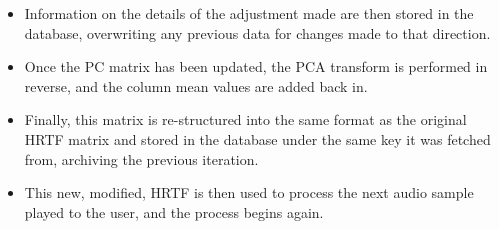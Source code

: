 \begin{itemize}
\begin{itemize}
\end{itemize}
\item Information on the details of the adjustment made are then stored in the database, overwriting any previous data for changes made to that direction.
\item Once the PC matrix has been updated, the PCA transform is performed in reverse, and the column mean values are added back in.
\item Finally, this matrix is re-structured into the same format as the original HRTF matrix and stored in the database under the same key it was fetched from, archiving the previous iteration. 
\item This new, modified, HRTF is then used to process the next audio sample played to the user, and the process begins again. 
\end{itemize}

